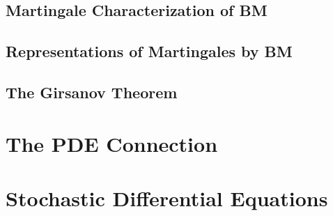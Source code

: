 \subsection{}


\subsection{Martingale Characterization of BM}
\begin{theorem}[Levy]
    
\end{theorem}

\subsection{Representations of Martingales by BM}


\begin{theorem}
    
\end{theorem}


\begin{theorem}
    
\end{theorem}

\subsection{The Girsanov Theorem}


\section{The PDE Connection}




\section{Stochastic Differential Equations}

